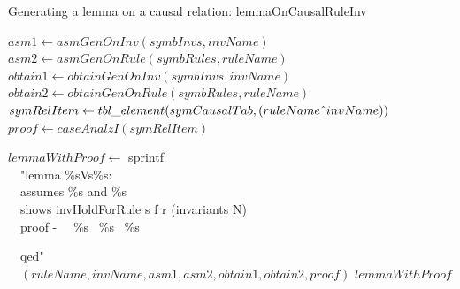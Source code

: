 \documentclass[final]{IEEEtran}
\def \twoSpaces {\ \ }
\def \cat {\symbol{94}}
\begin{document}
\begin{algorithm}
\caption{Generating a lemma on a causal relation: lemmaOnCausalRuleInv}\label{alg:lemmaOnCausalRuleInv}



{


 $asm1 \leftarrow asmGenOnInv(symbInvs,invName)$\;
 $asm2 \leftarrow asmGenOnRule(symbRules,ruleName)$\;
 $obtain1 \leftarrow obtainGenOnInv(symbInvs,invName)$\;
 $obtain2\leftarrow obtainGenOnRule(symbRules,ruleName)  $\;
  $symRelItem \leftarrow tbl\_element( symCausalTab,(ruleName\cat invName))$\;
 $proof \leftarrow caseAnalzI(symRelItem)$\;

$lemmaWithProof \leftarrow$ sprintf \\
\twoSpaces"lemma \%sVs\%s:\\
\twoSpaces assumes \%s and \%s\\
\twoSpaces  shows  invHoldForRule s f r (invariants   N)\\
\twoSpaces  proof -
\twoSpaces \%s~ \%s~  \%s

\twoSpaces qed"\\

\twoSpaces $(ruleName, invName, asm1,asm2, obtain1, obtain2, proof)$ \;
    \Return $lemmaWithProof$
}



\end{algorithm}
\end{document}
